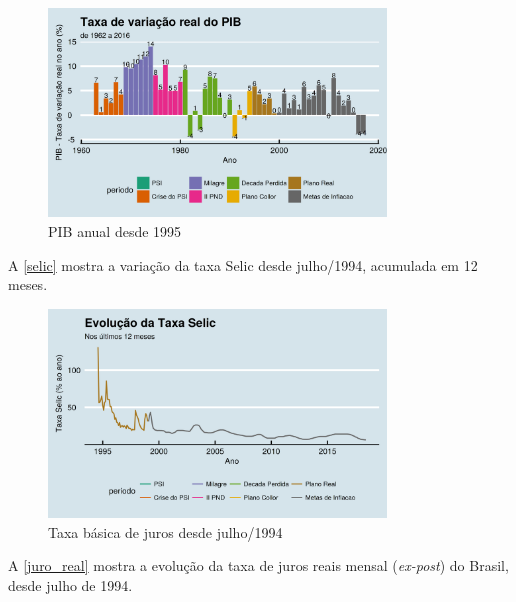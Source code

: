 \documentclass[
	10pt,				%
	openright,			%
	twoside,			%
	a5paper,			%
	english,			%
	french,				%
	spanish,			%
	brazil				%
	]{abntex2}
\begin{document}
\begin{figure}[htbp]
\caption{PIB anual desde 1995}\label{PIB_anual}
\begin{center}
\includegraphics[width=0.80000\textwidth]{imagens/PIB_anual.png}
\end{center}
\end{figure}

A \autoref{selic} mostra a variação da taxa Selic desde julho/1994,
acumulada em 12 meses.

\begin{figure}[htbp]
\caption{Taxa básica de juros desde julho/1994}\label{selic}
\begin{center}
\includegraphics[width=0.80000\textwidth]{imagens/selic-1.png}
\end{center}
\end{figure}

A \autoref{juro_real} mostra a evolução da taxa de juros reais mensal
(\emph{ex-post}) do Brasil, desde julho de 1994.
\end{document}
